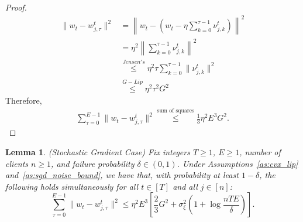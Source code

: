 \documentclass{article} %
\newtheorem{lemma}[]{Lemma}
\begin{document}
\begin{proof}
    \begin{align*}
        \|w_t - w_{j,\tau}^t\|^2 &= \left\|w_t -\left(w_t - \eta \sum_{k=0}^{\tau-1}\nu_{j,k}^t\right)\right\|^2
        \\
        & = \eta^2\left\|\sum_{k=0}^{\tau-1}\nu_{j,k}^t\right\|^2
        \\
        & \overset{Jensen's}{\leq} \eta^2 \tau\sum_{k=0}^{\tau-1}\|\nu_{j,k}^t\|^2
        \\
        & \overset{G-Lip}{\leq}\eta^2 \tau^2 G^2
    \end{align*}
    Therefore,
    \begin{align*}
        \sum_{\tau = 0}^{E-1}\|w_t - w_{j,\tau}^t\|^2 \overset{\text{sum of squares}}{\leq} \frac{1}{3}\eta^2 E^3 G^2.
    \end{align*}
\end{proof}
\begin{lemma}(Stochastic Gradient Case)
\label{lem:iterate_diff_stoch}
Fix integers $T \ge 1$, $E \ge 1$, number of clients $n \ge 1$, and failure probability $\delta \in (0,1)$.
Under Assumptions~\ref{as:cvx_lip} and~\ref{as:sgd_noise_bound}, we have that, with probability at least $1-\delta$, the following holds {simultaneously for all} $t \in [T]$ and all $j \in [n]$:
\begin{equation}
    \label{eq:local_drift_bound}
    \sum_{\tau=0}^{E-1} \bigl\|w_t - w_{j,\tau}^t\bigr\|^2
    \le
    \eta^2 E^3\left[
    \frac{2}{3}G^2 + \sigma_\xi^2\left(1 + \log\frac{nTE}{\delta}\right)
    \right].
\end{equation}
\end{lemma}
\end{document}

